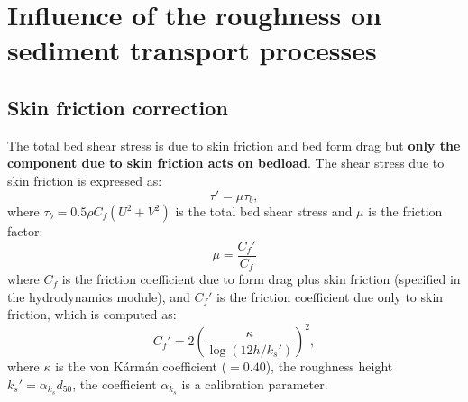 \section{Influence of the roughness on sediment transport processes}\label{sec:roug}
\subsection{Skin friction correction}\label{sec:skin}
The total bed shear stress is due to skin friction and bed form drag but \textbf{only the component due to skin friction acts on bedload}. The shear stress due to skin friction is expressed as:
\begin{equation}\label{eq:taup}
\tau'=\mu\tau_b,
\end{equation}
where $\tau_b = 0.5 \rho C_f (U^2 + V^2)$ is the total bed shear stress and $\mu$ is the friction factor:
\begin{equation}\label{eq:mu}
\mu=\frac{C_f'}{C_f}
\end{equation}
where $C_f$ is the friction coefficient due to form drag plus skin friction (specified in the hydrodynamics module), and $C_f'$ is the friction coefficient due only to skin friction, which is computed as:
\begin{equation}\label{eq:cfp}
C_f'=2\left(\frac{\kappa}{\log(12h/k_s')}\right)^2,
\end{equation}
where $\kappa$ is the von K\'arm\'an coefficient ($=0.40$), the roughness height $k_s'=\alpha_{k_s}d_{50}$, the coefficient $\alpha_{k_s}$ is a calibration parameter.

